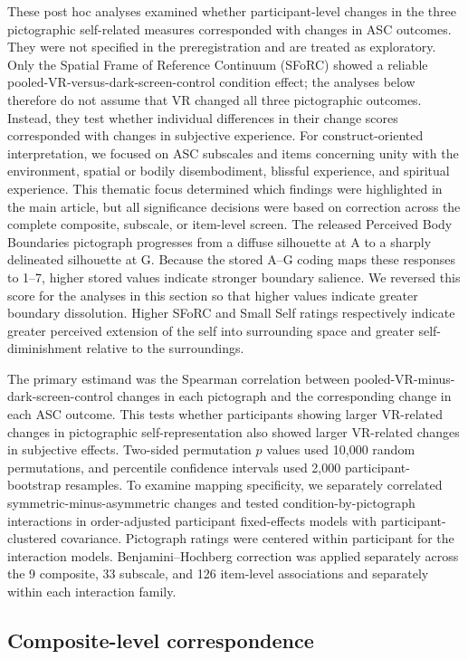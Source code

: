 \documentclass[pdflatex,sn-basic,lineno]{../sn-jnl}
\begin{document}
These post hoc analyses examined whether participant-level changes in the three pictographic self-related measures corresponded with changes in ASC outcomes. They were not specified in the preregistration and are treated as exploratory. Only the Spatial Frame of Reference Continuum (SFoRC) showed a reliable pooled-VR-versus-dark-screen-control condition effect; the analyses below therefore do not assume that VR changed all three pictographic outcomes. Instead, they test whether individual differences in their change scores corresponded with changes in subjective experience. For construct-oriented interpretation, we focused on ASC subscales and items concerning unity with the environment, spatial or bodily disembodiment, blissful experience, and spiritual experience. This thematic focus determined which findings were highlighted in the main article, but all significance decisions were based on correction across the complete composite, subscale, or item-level screen. The released Perceived Body Boundaries pictograph progresses from a diffuse silhouette at A to a sharply delineated silhouette at G. Because the stored A--G coding maps these responses to 1--7, higher stored values indicate stronger boundary salience. We reversed this score for the analyses in this section so that higher values indicate greater boundary dissolution. Higher SFoRC and Small Self ratings respectively indicate greater perceived extension of the self into surrounding space and greater self-diminishment relative to the surroundings.

The primary estimand was the Spearman correlation between pooled-VR-minus-dark-screen-control changes in each pictograph and the corresponding change in each ASC outcome. This tests whether participants showing larger VR-related changes in pictographic self-representation also showed larger VR-related changes in subjective effects. Two-sided permutation $p$ values used 10,000 random permutations, and percentile confidence intervals used 2,000 participant-bootstrap resamples. To examine mapping specificity, we separately correlated symmetric-minus-asymmetric changes and tested condition-by-pictograph interactions in order-adjusted participant fixed-effects models with participant-clustered covariance. Pictograph ratings were centered within participant for the interaction models. Benjamini--Hochberg correction was applied separately across the 9 composite, 33 subscale, and 126 item-level associations and separately within each interaction family.

\subsection{Composite-level correspondence}
\end{document}
